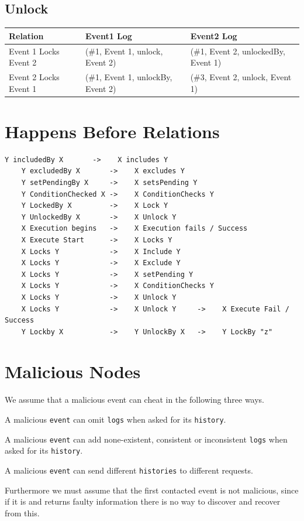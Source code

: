 \subsection{Unlock}
\begin{tabularx}{\textwidth}{|*{3}{>{\raggedright\arraybackslash}X|}}
  \hline
  Relation & Event1 Log & Event2 Log \\
  \hline
  Event 1 Locks Event 2 & (\#1, Event 1, unlock, Event 2) & (\#1, Event 2, unlockedBy, Event 1) \\
  \hline
  Event 2 Locks Event 1 & (\#1, Event 1, unlockBy, Event 2) & (\#3, Event 2, unlock, Event 1) \\
  \hline
\end{tabularx}

\section{Happens Before Relations}

\begin{lstlisting}[breaklines=true]
    Y includedBy X       ->    X includes Y
    Y excludedBy X       ->    X excludes Y
    Y setPendingBy X     ->    X setsPending Y
    Y ConditionChecked X ->    X ConditionChecks Y
    Y LockedBy X         ->    X Lock Y
    Y UnlockedBy X       ->    X Unlock Y
    X Execution begins   ->    X Execution fails / Success
    X Execute Start      ->    X Locks Y
    X Locks Y            ->    X Include Y
    X Locks Y            ->    X Exclude Y
    X Locks Y            ->    X setPending Y
    X Locks Y            ->    X ConditionChecks Y
    X Locks Y            ->    X Unlock Y
    X Locks Y            ->    X Unlock Y     ->    X Execute Fail / Success
    Y Lockby X           ->    Y UnlockBy X   ->    Y LockBy "z"
\end{lstlisting}

\section{Malicious Nodes}
We assume that a malicious event can cheat in the following three ways.
\begin{definition}\label{malevent-type-omit}
	A malicious \texttt{event} can omit \texttt{logs} when asked for its \texttt{history}.
\end{definition}
\begin{definition}\label{malevent-type-add}
	A malicious \texttt{event} can add none-existent, consistent or inconsistent \texttt{logs} when asked for its \texttt{history}.
\end{definition}
\begin{definition}\label{malevent-type-responddifferent}
	A malicious \texttt{event} can send different \texttt{histories} to different requests.
\end{definition}
Furthermore we must assume that the first contacted event is not malicious, since if it is and returns faulty information there is no way to discover and recover from this. 

